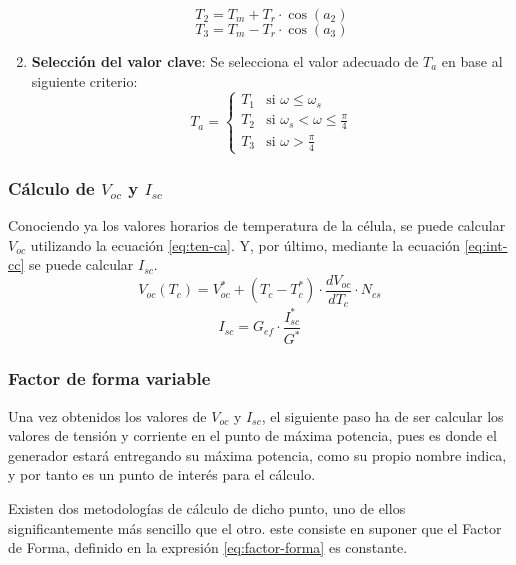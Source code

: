 \begin{enumerate}
\begin{equation}
\end{equation}
\begin{equation}
T_2 = T_m+T_r\cdot\cos(a_2)
\end{equation}
\begin{equation}
T_3=T_m-T_r\cdot\cos(a_3)
\end{equation}
\item \textbf{Selección del valor clave}: Se selecciona el valor adecuado de \(T_a\) en base al siguiente criterio:
\begin{equation}
T_a = \begin{cases}
T_1& \text{si $\omega \leq \omega_s$}\\
T_2& \text{si $\omega_s < \omega \leq \frac{\pi}{4}$}\\
T_3& \text{si $\omega > \frac{\pi}{4}$}
\end{cases}
\end{equation}
\end{enumerate}
\subsubsection{Cálculo de \(V_{oc}\) y \(I_{sc}\)}
\label{sec:org5aa63db}
Conociendo ya los valores horarios de temperatura de la célula, se puede calcular \(V_{oc}\) utilizando la ecuación \ref{eq:ten-ca}. Y, por último, mediante la ecuación \ref{eq:int-cc} se puede calcular \(I_{sc}\).
\begin{equation}
V_{oc}(T_c)=V_{oc}^*+(T_c-T_c^*)\cdot \frac{dV_{oc}}{dT_c}\cdot N_{cs}
\label{eq:ten-ca}
\end{equation}
\begin{equation}
I_{sc}=G_{ef}\cdot \frac{I_{sc}^*}{G^*}
\label{eq:int-cc}
\end{equation}

\subsubsection{Factor de forma variable}
\label{sec:org1cfdda9}
Una vez obtenidos los valores de \(V_{oc}\) y \(I_{sc}\), el siguiente paso ha de ser calcular los valores de tensión y corriente en el punto de máxima potencia, pues es donde el generador estará entregando su máxima potencia, como su propio nombre indica, y por tanto es un punto de interés para el cálculo.

Existen dos metodologías de cálculo de dicho punto, uno de ellos significantemente más sencillo que el otro. este consiste en suponer que el Factor de Forma, definido en la expresión \ref{eq:factor-forma} es constante.

